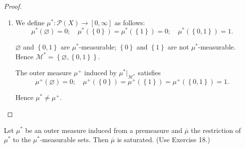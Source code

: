 \begin{proof}
\begin{enumerate}[itemsep=0pt,label={\textbf{\alph*.}}]
              According to Exercise 20a, \( \mu^{\ast}(E) = \mu^{+}(E) \) for every \( E \subseteq X \), hence \( \mu^{\ast} = \mu^{+} \).
        \item We define \( \mu^{\ast}: \mathcal{P}(X) \to [0, \infty] \) as follows:
              \[
                  \mu^{\ast}(\varnothing) = 0; \quad \mu^{\ast}(\left\{0\right\}) = \mu^{\ast}(\left\{1\right\}) = 0; \quad \mu^{\ast}(\left\{0, 1\right\}) = 1.
              \]

              \( \varnothing \) and \( \left\{ 0, 1 \right\} \) are \( \mu^{\ast} \)-measurable; \( \left\{ 0 \right\} \) and \( \left\{ 1 \right\} \) are not \( \mu^{\ast} \)-measurable. Hence \( \mathcal{M}^{\ast} = \left\{ \varnothing, \left\{ 0, 1 \right\} \right\} \).

              The outer measure \( \mu^{+} \) induced by \( \mu^{\ast}\vert_{\mathcal{M}^{\ast}} \) satisfies
              \[
                  \mu^{+}(\varnothing) = 0; \quad \mu^{+}(\left\{ 0 \right\}) = \mu^{+}(\left\{ 1 \right\}) = \mu^{+}(\left\{ 0, 1 \right\}) = 1.
              \]

              Hence \( \mu^{\ast} \ne \mu^{+} \).
    \end{enumerate}
\end{proof}

\newpage

\begin{exercise}
    Let \( \mu^{\ast} \) be an outer measure induced from a premeasure and \( \overline{\mu} \) the restriction of \( \mu^{\ast} \) to the \( \mu^{\ast} \)-measurable sets. Then \( \overline{\mu} \) is saturated. (Use Exercise 18.)
\end{exercise}

